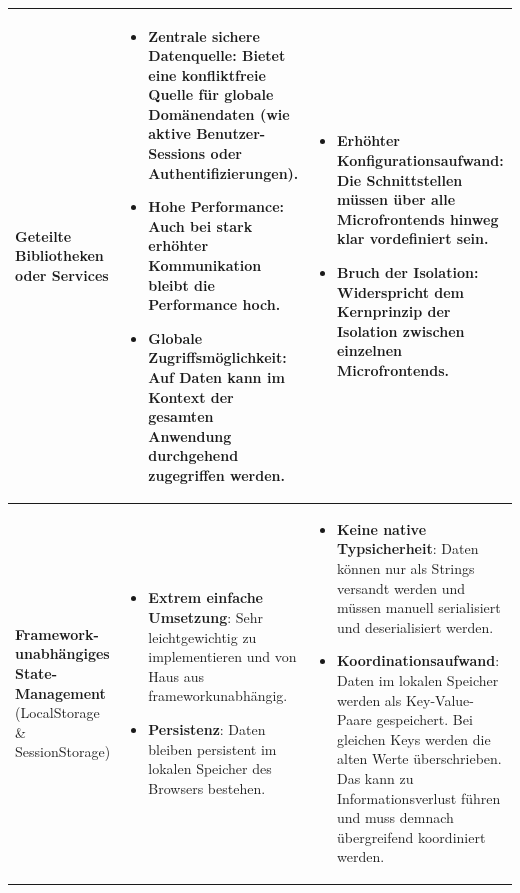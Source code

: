 \begin{xltabular}{\textwidth}{>{\hsize\raggedright\arraybackslash}X|>{\hsize\raggedright\arraybackslash}X|>{\hsize\raggedright\arraybackslash}X}
  \textbf{Geteilte Bibliotheken oder Services} &
  \begin{itemize}[leftmargin=*]
    \item \textbf{Zentrale sichere Datenquelle}: Bietet eine konfliktfreie Quelle für globale Domänendaten (wie aktive Benutzer-Sessions oder Authentifizierungen).
    \item \textbf{Hohe Performance}: Auch bei stark erhöhter Kommunikation bleibt die Performance hoch.
    \item \textbf{Globale Zugriffsmöglichkeit}: Auf Daten kann im Kontext der gesamten Anwendung durchgehend zugegriffen werden.
  \end{itemize} &
  \begin{itemize}[leftmargin=*]
    \item \textbf{Erhöhter Konfigurationsaufwand}: Die Schnittstellen müssen über alle Microfrontends hinweg klar vordefiniert sein.
    \item \textbf{Bruch der Isolation}: Widerspricht dem Kernprinzip der Isolation zwischen einzelnen Microfrontends.
  \end{itemize} \\ \hline

  \textbf{Framework-unabhängiges State-Management} (LocalStorage \& SessionStorage) &
  \begin{itemize}[leftmargin=*]
    \item \textbf{Extrem einfache Umsetzung}: Sehr leichtgewichtig zu implementieren und von Haus aus frameworkunabhängig.
    \item \textbf{Persistenz}: Daten bleiben persistent im lokalen Speicher des Browsers bestehen.
  \end{itemize} &
  \begin{itemize}[leftmargin=*]
    \item \textbf{Keine native Typsicherheit}: Daten können nur als Strings versandt werden und müssen manuell serialisiert und deserialisiert werden.
    \item \textbf{Koordinationsaufwand}: Daten im lokalen Speicher werden als Key-Value-Paare gespeichert. Bei gleichen Keys werden die alten Werte überschrieben. Das kann zu Informationsverlust führen und muss demnach übergreifend koordiniert werden.
  \end{itemize} \\ \hline


\end{xltabular}
